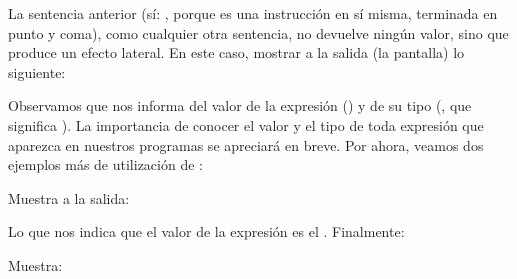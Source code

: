 \documentclass[a4paper,12pt,spanish]{sphinxmanual}
\begin{document}
La sentencia anterior (sí: , porque es una instrucción en sí misma,
terminada en punto y coma), como cualquier otra sentencia, no devuelve ningún
valor, sino que produce un efecto lateral. En este caso, mostrar a la salida
(la pantalla) lo siguiente:

%
\begin{sphinxVerbatim}[commandchars=\\\{\}]
\end{sphinxVerbatim}

\ignorespaces 
Observamos que  nos informa del valor de la expresión () y de
su tipo (, que significa ). La importancia de conocer
el valor y el tipo de toda expresión que aparezca en nuestros programas se
apreciará en breve. Por ahora, veamos dos ejemplos más de utilización de
:

%
\begin{sphinxVerbatim}[commandchars=\\\{\}]
  
\end{sphinxVerbatim}

Muestra a la salida:

%
\begin{sphinxVerbatim}[commandchars=\\\{\}]
\end{sphinxVerbatim}

\ignorespaces 
Lo que nos indica que el valor de la expresión  es el  . Finalmente:

%
\begin{sphinxVerbatim}[commandchars=\\\{\}]
\end{sphinxVerbatim}

Muestra:

%
\begin{sphinxVerbatim}[commandchars=\\\{\}]
 
\end{sphinxVerbatim}
\end{document}
